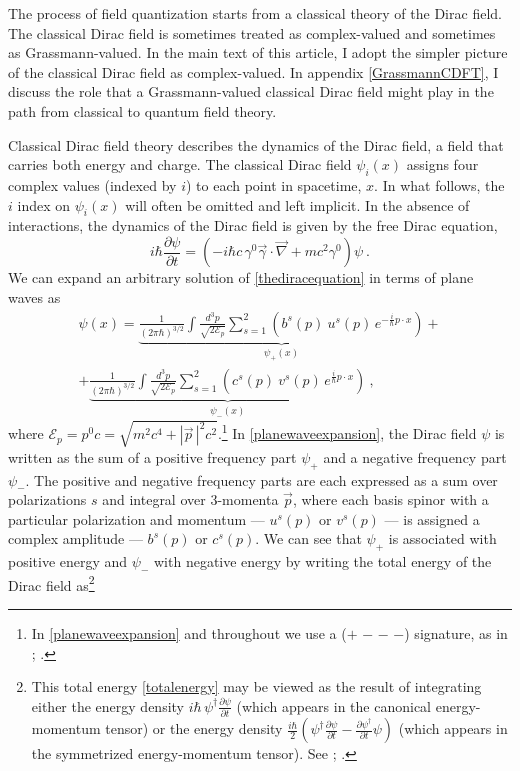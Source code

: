 \documentclass[12pt,secnumarabic,amsmath,amssymb,balancelastpage,nofootinbib]{article}
\begin{document}
The process of field quantization starts from a classical theory of the Dirac field.  The classical Dirac field is sometimes treated as complex-valued and sometimes as Grassmann-valued.  In the main text of this article, I adopt the simpler picture of the classical Dirac field as complex-valued.  In appendix \ref{GrassmannCDFT}, I discuss the role that a Grassmann-valued classical Dirac field might play in the path from classical to quantum field theory.

Classical Dirac field theory describes the dynamics of the Dirac field, a field that carries both energy and charge.  The classical Dirac field $\psi_i(x)$ assigns four complex values (indexed by $i$) to each point in spacetime, $x$.  In what follows, the $i$ index on $\psi_i(x)$ will often be omitted and left implicit.  In the absence of interactions, the dynamics of the Dirac field is given by the free Dirac equation,
\begin{equation}
i\hbar \frac{\partial \psi}{\partial t}=\left(-i\hbar c \, \gamma^0 \vec{\gamma}\cdot\vec{\nabla}+ mc^2 \gamma^0 \right)\psi
\ .
\label{thediracequation}
\end{equation}
We can expand an arbitrary solution of \eqref{thediracequation} in terms of plane waves as
\begin{multline}
\psi (x) =\underbrace{\frac{1}{(2\pi\hbar)^{3/2}}\int{ \frac{d^3 p}{\sqrt{2 \mathcal{E}_p}} \sum_{s=1}^2 \left(b^s (p) \: u^s (p) \, e^{-\frac{i}{\hbar} p \cdot x}\right)}}_{\mbox{$\psi_+(x)$}}
+ \\ 
+ \underbrace{\frac{1}{(2\pi\hbar)^{3/2}}\int{ \frac{d^3 p}{\sqrt{2 \mathcal{E}_p}} \sum_{s=1}^2 \left(c^s (p) \: v^s (p) \,  e^{\frac{i}{\hbar} p \cdot x}\right)}}_{\mbox{$\psi_-(x)$}}
\ ,
\label{planewaveexpansion}
\end{multline}
where $\mathcal{E}_p = p^0 c = \sqrt{m^2 c^4 + |\vec{p}\,|^2 c^2}$.\footnote{In \eqref{planewaveexpansion} and throughout we use a ($+$ $-$ $-$ $-$) signature, as in \citet{bjorkendrell, bjorkendrellfields}; \citet{peskinschroeder}.}  In \eqref{planewaveexpansion}, the Dirac field $\psi$ is written as the sum of a positive frequency part $\psi_+$ and a negative frequency part $\psi_-$.  The positive and negative frequency parts are each expressed as a sum over polarizations $s$ and integral over 3-momenta $\vec{p}$, where each basis spinor with a particular polarization and momentum --- $u^s (p)$ or $v^s (p)$ --- is assigned a complex amplitude --- $b^s (p)$ or $c^s (p)$.  We can see that $\psi_+$ is associated with positive energy and $\psi_-$ with negative energy by writing the total energy of the Dirac field as\footnote{This total energy \eqref{totalenergy} may be viewed as the result of integrating either the energy density $i \hbar \, \psi^\dagger\frac{\partial \psi}{\partial t}$ (which appears in the canonical energy-momentum tensor) or the energy density $\frac{i \hbar}{2}\left(\psi^\dagger\frac{\partial \psi}{\partial t}-\frac{\partial \psi^\dagger}{\partial t}\psi\right)$ (which appears in the symmetrized energy-momentum tensor).  See \citet[pg.\ 419]{heitler}; \citet[pg.\ 219]{schweberQFT}.\label{twodensities}}
\end{document}
